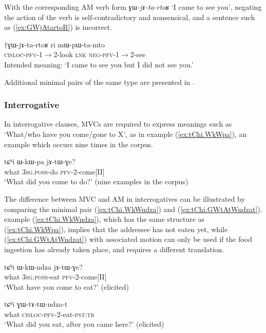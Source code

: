 \documentclass[oneside,a4paper,11pt]{article}
\newcommand{\japhug}[2]{\textit{\phon#1} `#2'}
\newcommand{\fl}{$\rightarrow$}
\begin{document}
With the corresponding AM verb form \japhug{ɣɯ-jɤ-ta-rtoʁ}{I came to see you}, negating the action of the verb is self-contradictory and nonsensical, and a sentence such as (\ref{ex:GWjAtartoR}) is incorrect.

\begin{exe}
\ex \label{ex:GWjAtartoR}
\gll $\dagger$ɣɯ-jɤ-ta-rtoʁ ri mɯ-pɯ-ta-mto \\
\textsc{cisloc}-\textsc{pfv}-1\fl2-look \textsc{lnk} \textsc{neg}-\textsc{pfv}-1\fl2-see \\
\glt Intended meaning: `I came to see you but I did not see you.' 
\end{exe}

Additional minimal pairs of the same type are presented in \citet[202-203]{jacques13harmonization}.


\subsubsection{Interrogative} \label{sec:am.interrogative}
In interrogative clauses, MVCs are required to express meanings such as `What/who have you come/gone to X', as in example (\ref{ex:tChi.WkWpa}), an example which occurs nine times in the corpus.

\begin{exe}
\ex \label{ex:tChi.WkWpa}
\gll tɕʰi ɯ-kɯ-pa jɤ-tɯ-ɣe? \\
what \textsc{3sg.poss}-do \textsc{pfv}-2-come[II] \\
\glt `What did you come to do?' (nine examples in the corpus)
\end{exe}

The difference between MVC and AM in interrogatives can be illustrated by comparing the minimal pair  (\ref{ex:tChi.WkWndza}) and (\ref{ex:tChi.GWtAtWndzat}). example (\ref{ex:tChi.WkWndza}), which has the same structure as (\ref{ex:tChi.WkWpa}), implies that the addressee has not eaten yet, while (\ref{ex:tChi.GWtAtWndzat}) with associated motion can only be used if the food ingestion has already taken place, and requires a different translation.

\begin{exe}
\ex \label{ex:tChi.WkWndza}
\gll tɕʰi ɯ-kɯ-ndza jɤ-tɯ-ɣe? \\
what \textsc{3sg.poss}-eat \textsc{pfv}-2-come[II] \\
\glt `What have you come to eat?' (elicited)
\end{exe}

\begin{exe}
\ex \label{ex:tChi.GWtAtWndzat}
\gll tɕʰi ɣɯ-tɤ-tɯ-ndza-t \\
what \textsc{cisloc}-\textsc{pfv}-2-eat-\textsc{pst:tr}    \\
\glt `What did you eat, after you came here?' (elicited)
\end{exe}
\end{document}
